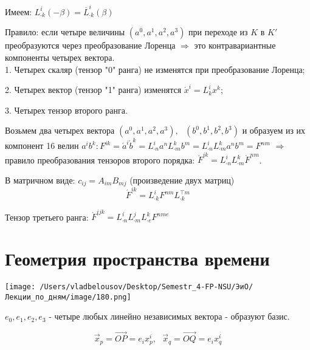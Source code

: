\documentclass[12pt, a4paper]{report}
\begin{document}
Имеем: \( L^{i } _{\cdot k }  (- \beta ) = \overline{L }^i _{\cdot k} (\beta)    \) 

Правило: если четыре величины \( (a^0 , a^1 , a^2 , a^3 ) \) при переходе из \( K \) в \( K'  \) преобразуются через преобразование Лоренца \( \Rightarrow \) это контравариантные компоненты четырех вектора. \\

1. Четырех скаляр (тензор "0" ранга) не изменятся при  преобразование Лоренца; 

2. Четырех вектор (тензор "1" ранга) изменятся \(  \acute{x} ^i = L_k ^i x^k \); 

3. Четырех тензор второго ранга. 

Возьмем два четырех вектора \( (a^0 , a^1 , a^2 , a^3 ) , \text{ }  (b^0, b^1 , b^2 , b^3) \)  и образуем из их компонент 16 велин \( a^i b^k : F^{ik } = \acute{a } ^i  \acute{b } ^k = L^{i }_{\cdot n }   a^n L^k _{\cdot m}  b^m = L^i _{\cdot n}  L^k _{\cdot m}  a^n b^m = F^{nm}  \) \( \Rightarrow  \) правило преобразования тензоров второго порядка: \(  \acute{F} ^{ik }  = L_{ \cdot n} ^i L_{\cdot m}  ^k  \acute{F} ^{nm }  \). 

В матричном виде: \(c_{i j }  = A_{i m }  B_{m j }     \) (произведение двух матриц)
\[  \acute{ F } ^{ik }  = L^i _{\cdot k }  F^{nm }  L^{\top m       } _{\cdot k}  \] 

Тензор третьего ранга: \( \acute{F } ^{ i j k } = L_{ \cdot n }  ^i L_{\cdot m }  ^j L_{\cdot e } ^k F^{nm e}  \)  

\section{Геометрия пространства времени}

\begin{center}
    \texttt{[image: /Users/vladbelousov/Desktop/Semestr\_4-FP-NSU/ЭиО/Лекции\_по\_дням/image/180.png]}
\end{center}

\( e_0 , e_1 ,e_2 ,e_3  \) - четыре любых линейно независимых вектора - образуют базис. 

\[ \vec{ x }  _ p = \overrightarrow{OP } = e_i x^i _ p , \text{ }  \vec{x } _q = \overrightarrow{OQ} = e_i x^i _q   \] 
\end{document}
